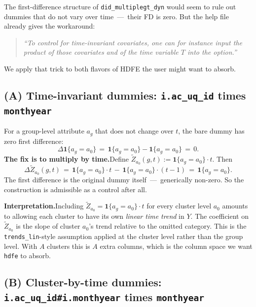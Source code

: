\documentclass[11pt]{article}
\newcommand{\code}[1]{\texttt{\small #1}}
\newcommand{\1}{\mathbb{1}}
\begin{document}
The first-difference structure of \code{did\_multiplegt\_dyn} would seem to
rule out dummies that do not vary over time \,---\, their FD is zero. But the
help file already gives the workaround:
\begin{quote}\itshape
``To control for time-invariant covariates, one can for instance input the
product of those covariates and of the time variable $T$ into the option.''
\end{quote}
We apply that trick to both flavors of HDFE the user might want to absorb.

\subsection*{(A) Time-invariant dummies: \code{i.ac\_uq\_id} times \code{monthyear}}

For a group-level attribute $a_g$ that does not change over $t$, the bare
dummy has zero first difference:
\begin{equation}
\Delta \mathbf{1}\{a_g = a_0\} \,=\, \mathbf{1}\{a_g = a_0\} - \mathbf{1}\{a_g = a_0\} \,=\, 0.
\label{eq:bareinvariant}
\end{equation}
\textbf{The fix is to multiply by time.}\;Define
$\widetilde{Z}_{a_0}(g,t) := \mathbf{1}\{a_g = a_0\}\cdot t$. Then
\begin{equation}
\Delta \widetilde{Z}_{a_0}(g,t) \,=\, \mathbf{1}\{a_g = a_0\}\cdot t \,-\, \mathbf{1}\{a_g = a_0\}\cdot (t-1) \,=\, \mathbf{1}\{a_g = a_0\}.
\label{eq:Ztime}
\end{equation}
The first difference is the original dummy itself \,---\, generically non-zero.
So the construction is admissible as a control after all.

\medskip\noindent
\textbf{Interpretation.}\;Including
$\widetilde{Z}_{a_0} = \mathbf{1}\{a_g = a_0\}\cdot t$ for every cluster
level $a_0$ amounts to allowing each cluster to have its own
\emph{linear time trend} in $Y$. The coefficient on $\widetilde{Z}_{a_0}$
is the slope of cluster $a_0$'s trend relative to the omitted category.
This is the \texttt{trends\_lin}-style assumption applied at the cluster
level rather than the group level. With $A$ clusters this is $A$ extra
columns, which is the column space we want \code{hdfe} to absorb.

\subsection*{(B) Cluster-by-time dummies: \code{i.ac\_uq\_id\#i.monthyear} times \code{monthyear}}
\end{document}
